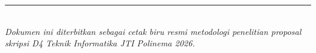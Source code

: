 \documentclass[10pt,a4paper]{article}
\begin{document}
\vspace{0.2cm}
\renewcommand{\refname}{\large \textbf{\color{navy}Daftar Pustaka Rujukan Utama}}



\vspace{0.3cm}
\begin{center}
    \rule{0.6\textwidth}{0.8pt}\\[3pt]
    \footnotesize \textit{Dokumen ini diterbitkan sebagai cetak biru resmi metodologi penelitian proposal skripsi D4 Teknik Informatika JTI Polinema 2026.}
\end{center}
\end{document}
